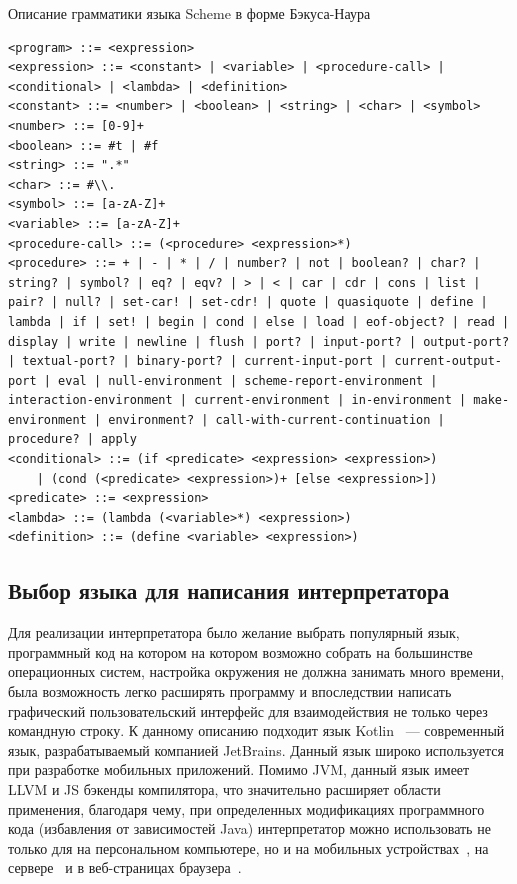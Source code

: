 \documentclass[14pt, russian]{scrartcl}
\begin{document}
\begin{listing}[!htb]
\caption{Описание грамматики языка Scheme в форме Бэкуса-Наура}
\label{lst:schemebnf}
\begin{verbatim}
<program> ::= <expression>
<expression> ::= <constant> | <variable> | <procedure-call> | <conditional> | <lambda> | <definition>
<constant> ::= <number> | <boolean> | <string> | <char> | <symbol>
<number> ::= [0-9]+
<boolean> ::= #t | #f
<string> ::= ".*"
<char> ::= #\\.
<symbol> ::= [a-zA-Z]+
<variable> ::= [a-zA-Z]+
<procedure-call> ::= (<procedure> <expression>*)
<procedure> ::= + | - | * | / | number? | not | boolean? | char? | string? | symbol? | eq? | eqv? | > | < | car | cdr | cons | list | pair? | null? | set-car! | set-cdr! | quote | quasiquote | define | lambda | if | set! | begin | cond | else | load | eof-object? | read | display | write | newline | flush | port? | input-port? | output-port? | textual-port? | binary-port? | current-input-port | current-output-port | eval | null-environment | scheme-report-environment | interaction-environment | current-environment | in-environment | make-environment | environment? | call-with-current-continuation | procedure? | apply
<conditional> ::= (if <predicate> <expression> <expression>)
	| (cond (<predicate> <expression>)+ [else <expression>])
<predicate> ::= <expression>
<lambda> ::= (lambda (<variable>*) <expression>)
<definition> ::= (define <variable> <expression>)
\end{verbatim}
\end{listing}

\subsection{Выбор языка для написания интерпретатора}

Для реализации интерпретатора было желание выбрать популярный язык, программный код на котором на котором возможно собрать на большинстве операционных систем, настройка окружения не должна занимать много времени, была возможность легко расширять программу и впоследствии написать графический пользовательский интерфейс для взаимодействия не только через командную строку.
К данному описанию подходит язык Kotlin~\cite{Kotlindocs} --- современный язык, разрабатываемый компанией JetBrains.
Данный язык широко используется при разработке мобильных приложений.
Помимо JVM, данный язык имеет LLVM и JS бэкенды компилятора, что значительно расширяет области применения, благодаря чему, при определенных модификациях программного кода (избавления от зависимостей Java) интерпретатор можно использовать не только для на персональном компьютере, но и на мобильных устройствах~\cite{Kmm}, на сервере~\cite{Kserv} и в веб-страницах браузера~\cite{Kjs}.
\end{document}
